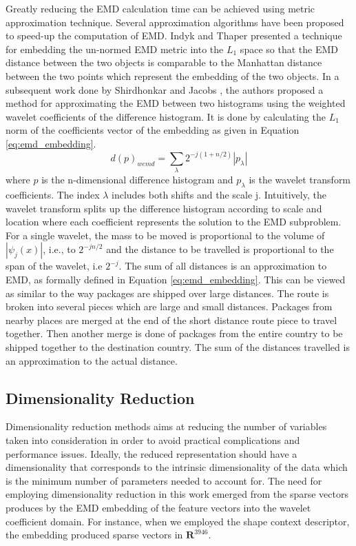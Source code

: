 \documentclass[10pt, conference, compsocconf]{IEEEtran}
\begin{document}
Greatly reducing the EMD calculation time can be achieved using metric approximation technique.  
Several approximation algorithms have been proposed to speed-up the computation of EMD. 
Indyk and Thaper \cite{indyk2003fast} presented a technique for embedding the un-normed EMD metric into the $L_1$ space so that the EMD distance between the two objects is comparable to the Manhattan distance between the two points which represent the embedding of the two objects.
In a subsequent work done by Shirdhonkar and Jacobs \cite{shirdhonkar2008approximate}, the authors proposed a method for approximating the EMD between two histograms using the weighted wavelet coefficients of the difference histogram. 
It is done by calculating the $L_1$ norm of the coefficients vector of the embedding as given in Equation \ref{eq:emd_embedding}.
\begin{equation}
d(p)_{wemd}= \sum\limits_{\lambda} 2^{-j(1+n/2)}|p_{\lambda}|
\label{eq:emd_embedding}
\end{equation}
where $p$ is the n-dimensional difference histogram and $p_{\lambda}$ is the wavelet transform coefficients. 
The index $\lambda$ includes both shifts and the scale j.
Intuitively, the wavelet transform splits up the difference histogram according to scale and location where each coefficient represents the solution to the EMD subproblem. 
For a single wavelet, the mass to be moved is proportional to the volume of $|\psi_j(x)|$, i.e., to $2^{-jn/2}$ and the distance to be travelled is proportional to the span of the wavelet, i.e $2^{-j}$. The sum of all distances is an approximation to EMD, as formally defined in Equation \ref{eq:emd_embedding}. 
This can be viewed as similar to the way packages are shipped over large distances. 
The route is broken into several pieces which are large and small distances. 
Packages from nearby places are merged at the end of the short distance route piece to travel together. 
Then another merge is done of packages from the entire country to be shipped together to the destination country. 
The sum of the distances travelled is an approximation to the actual distance.

\subsection{Dimensionality Reduction}
\label{subsec:dimensionality_reduction}
Dimensionality reduction methods aims at reducing the number of variables taken into consideration in order to avoid practical complications and performance issues. 
Ideally, the reduced representation should have a dimensionality that corresponds to the intrinsic dimensionality of the data \cite{van2009dimensionality} which is the minimum number of parameters needed to account for.
The need for employing dimensionality reduction in this work emerged from the sparse vectors produces by the EMD embedding of the feature vectors into the wavelet coefficient domain.
For instance, when we employed the shape context descriptor, the embedding produced sparse vectors in $\mathbf{R}^{3946}$. 
\end{document}
